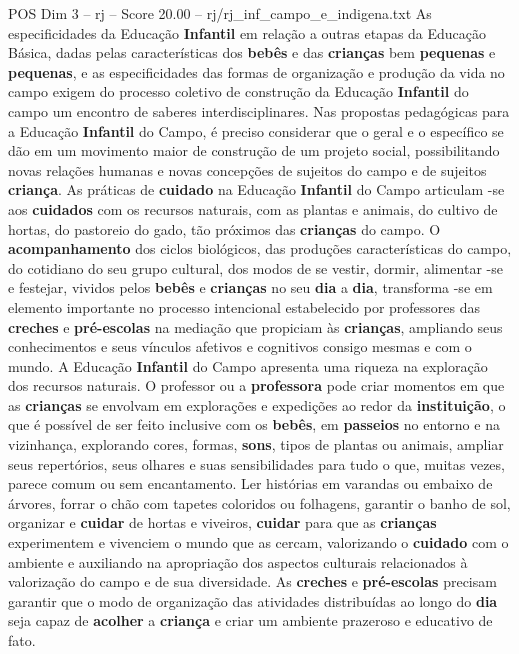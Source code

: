 \begin{textsample}{POS Dim 3 – rj – Score 20.00 – rj/rj\_inf\_campo\_e\_indigena.txt}
As especificidades da Educação \textbf{Infantil} em relação a outras etapas da Educação Básica, dadas pelas características dos \textbf{bebês} e das \textbf{crianças} bem \textbf{pequenas} e \textbf{pequenas}, e as especificidades das formas de organização e produção da vida no campo exigem do processo coletivo de construção da Educação \textbf{Infantil} do campo um encontro de saberes interdisciplinares.
Nas propostas pedagógicas para a Educação \textbf{Infantil} do Campo, é preciso considerar que o geral e o específico se dão em um movimento maior de construção de um projeto social, possibilitando novas relações humanas e novas concepções de sujeitos do campo e de sujeitos \textbf{criança}.
As práticas de \textbf{cuidado} na Educação \textbf{Infantil} do Campo articulam -se aos \textbf{cuidados} com os recursos naturais, com as plantas e animais, do cultivo de hortas, do pastoreio do gado, tão próximos das \textbf{crianças} do campo.
O \textbf{acompanhamento} dos ciclos biológicos, das produções características do campo, do cotidiano do seu grupo cultural, dos modos de se vestir, dormir, alimentar -se e festejar, vividos pelos \textbf{bebês} e \textbf{crianças} no seu \textbf{dia} a \textbf{dia}, transforma -se em elemento importante no processo intencional estabelecido por professores das \textbf{creches} e \textbf{pré-escolas} na mediação que propiciam às \textbf{crianças}, ampliando seus conhecimentos e seus vínculos afetivos e cognitivos consigo mesmas e com o mundo.
A Educação \textbf{Infantil} do Campo apresenta uma riqueza na exploração dos recursos naturais.
O professor ou a \textbf{professora} pode criar momentos em que as \textbf{crianças} se envolvam em explorações e expedições ao redor da \textbf{instituição}, o que é possível de ser feito inclusive com os \textbf{bebês}, em \textbf{passeios} no entorno e na vizinhança, explorando cores, formas, \textbf{sons}, tipos de plantas ou animais, ampliar seus repertórios, seus olhares e suas sensibilidades para tudo o que, muitas vezes, parece comum ou sem encantamento.
Ler histórias em varandas ou embaixo de árvores, forrar o chão com tapetes coloridos ou folhagens, garantir o banho de sol, organizar e \textbf{cuidar} de hortas e viveiros, \textbf{cuidar} para que as \textbf{crianças} experimentem e vivenciem o mundo que as cercam, valorizando o \textbf{cuidado} com o ambiente e auxiliando na apropriação dos aspectos culturais relacionados à valorização do campo e de sua diversidade.
As \textbf{creches} e \textbf{pré-escolas} precisam garantir que o modo de organização das atividades distribuídas ao longo do \textbf{dia} seja capaz de \textbf{acolher} a \textbf{criança} e criar um ambiente prazeroso e educativo de fato.

\end{textsample}
